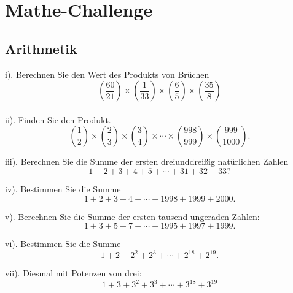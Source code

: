 \chapter*{Mathe-Challenge}

\section*{Arithmetik}

i). Berechnen Sie den Wert des Produkts von Brüchen $$\left(\frac{60}{21}\right)\times\left(\frac{1}{33}\right)\times\left(\frac{6}{5}\right)\times \left(\frac{35}{8}\right)$$\\


ii). Finden Sie den Produkt. $$\left(\frac{1}{2}\right)\times\left(\frac{2}{3}\right)\times\left(\frac{3}{4}\right)\times\cdots \times\left(\frac{998}{999}\right)\times\left( \frac{999}{1000}\right).$$

iii). Berechnen Sie die Summe der ersten dreiunddreißig natürlichen Zahlen $$1+2+3+4+5+\cdots+31+32 +33?$$

iv). Bestimmen Sie die Summe $$1+2+3+4+\cdots +1998+1999+2000.$$


v). Berechnen Sie die Summe der ersten tausend ungeraden Zahlen: $$1+3+5+7+\cdots +1995+1997+1999.$$


vi). Bestimmen Sie die Summe $$1+2+2^2+2^3+\cdots +2^{18}+2^{19}.$$


vii). Diesmal mit Potenzen von drei: $$1+3+3^2+3^3+\cdots +3^{18}+3^{19}$$


